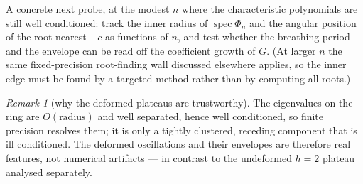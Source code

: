 \documentclass[11pt, fleqn]{amsart}
\theoremstyle{remark}
\newtheorem{remark}{Remark}
\DeclareMathOperator{\spec}{spec}
\begin{document}
A concrete next probe, at the modest $n$ where the characteristic polynomials are still
well conditioned: track the inner radius of $\spec\Phi_n$ and the angular position of the
root nearest $-c$ as functions of $n$, and test whether the breathing period and the
envelope can be read off the coefficient growth of $G$. (At larger $n$ the same
fixed-precision root-finding wall discussed elsewhere applies, so the inner edge must be
found by a targeted method rather than by computing all roots.)

\begin{remark}[why the deformed plateaus are trustworthy]
The eigenvalues on the ring are $O(\text{radius})$ and well separated, hence well
conditioned, so finite precision resolves them; it is only a tightly clustered, receding
component that is ill conditioned. The deformed oscillations and their envelopes are
therefore real features, not numerical artifacts --- in contrast to the undeformed
$h=2$ plateau analysed separately.
\end{remark}
\end{document}
